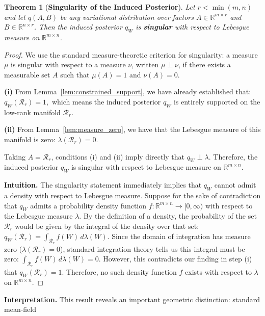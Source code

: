 \documentclass{article}
\theoremstyle{plain}
\newtheorem{theorem}{Theorem}[section]
\theoremstyle{definition}
\theoremstyle{remark}
\begin{document}
\begin{theorem}[\textbf{Singularity of the Induced Posterior}]
\label{thm:singularity}
Let $r < \min(m,n)$ and let $q(A,B)$ be any variational distribution over 
factors $A \in \mathbb{R}^{m \times r}$ and $B \in \mathbb{R}^{n \times r}$. 
Then the induced posterior $q_W$ is \textbf{singular} with respect to Lebesgue 
measure on $\mathbb{R}^{m \times n}$.
\end{theorem}
\begin{proof}
We use the standard measure-theoretic criterion for singularity: a measure $\mu$
is singular with respect to a measure $\nu$, written $\mu \perp \nu$, if there exists a measurable set
$A$ such that $\mu(A)=1$ and $\nu(A)=0$.


\textbf{(i)} From Lemma~\ref{lem:constrained_support}, we have already established that:
$
q_W(\mathcal{R}_r) = 1,
$
which means the induced posterior $q_W$ is entirely supported on the 
low-rank manifold $\mathcal{R}_r$.

\textbf{(ii)} From Lemma~\ref{lem:measure_zero}, we have that the Lebesgue measure 
of this manifold is zero:
$
\lambda(\mathcal{R}_r) = 0.
$

Taking $A=\mathcal{R}_r$, conditions (i) and (ii) imply directly that
$q_W \perp \lambda$. Therefore, the induced posterior $q_W$ is singular with
respect to Lebesgue measure on $\mathbb{R}^{m \times n}$.

\textbf{Intuition.} The singularity statement immediately implies that $q_W$
cannot admit a density with respect to Lebesgue measure. Suppose for the sake of contradiction that $q_W$ admits a probability density function $f : \mathbb{R}^{m \times n} \rightarrow [0, \infty)$ with respect to the Lebesgue measure $\lambda$. By the definition of a density, the probability of the set $\mathcal{R}_r$ 
would be given by the integral of the density over that set:
$
q_W(\mathcal{R}_r) = \int_{\mathcal{R}_r} f(W) \, d\lambda(W).
$ Since the domain of integration has measure zero ($\lambda(\mathcal{R}_r) = 0$), 
standard integration theory tells us this integral must be zero:
$
\int_{\mathcal{R}_r} f(W) \, d\lambda(W) = 0.
$ However, this contradicts our finding in step (i) that $q_W(\mathcal{R}_r) = 1$.
 Therefore, no such density function $f$ exists with respect to $\lambda$ on $\mathbb{R}^{m \times n}$.
\end{proof}
\textbf{Interpretation.}
This result reveals an important geometric distinction: standard mean-field 
\end{document}
